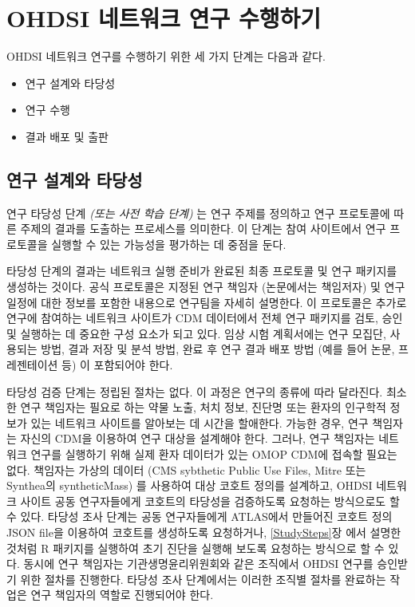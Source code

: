 \documentclass[11pt]{book}
\providecommand{\tightlist}{%
  \setlength{\itemsep}{0pt}\setlength{\parskip}{0pt}}
\theoremstyle{definition}
\theoremstyle{definition}
\theoremstyle{definition}
\theoremstyle{remark}
\begin{document}
\section{OHDSI 네트워크 연구 수행하기}\label{ohdsi---}


OHDSI 네트워크 연구를 수행하기 위한 세 가지 단계는 다음과 같다.

\begin{itemize}
\tightlist
\item
  연구 설계와 타당성
\item
  연구 수행
\item
  결과 배포 및 출판
\end{itemize}

\subsection{연구 설계와 타당성}\label{--}

연구 타당성 단계 \emph{(또는 사전 학습 단계)} 는 연구 주제를 정의하고
연구 프로토콜에 따른 주제의 결과를 도출하는 프로세스를 의미한다. 이
단계는 참여 사이트에서 연구 프로토콜을 실행할 수 있는 가능성을 평가하는
데 중점을 둔다.

타당성 단계의 결과는 네트워크 실행 준비가 완료된 최종 프로토콜 및 연구
패키지를 생성하는 것이다. 공식 프로토콜은 지정된 연구 책임자 (논문에서는
책임저자) 및 연구 일정에 대한 정보를 포함한 내용으로 연구팀을 자세히
설명한다. 이 프로토콜은 추가로 연구에 참여하는 네트워크 사이트가 CDM
데이터에서 전체 연구 패키지를 검토, 승인 및 실행하는 데 중요한 구성
요소가 되고 있다. 임상 시험 계획서에는 연구 모집단, 사용되는 방법, 결과
저장 및 분석 방법, 완료 후 연구 결과 배포 방법 (예를 들어 논문,
프레젠테이션 등) 이 포함되어야 한다.

타당성 검증 단계는 정립된 절차는 없다. 이 과정은 연구의 종류에 따라
달라진다. 최소한 연구 책임자는 필요로 하는 약물 노출, 처치 정보, 진단명
또는 환자의 인구학적 정보가 있는 네트워크 사이트를 알아보는 데 시간을
할애한다. 가능한 경우, 연구 책임자는 자신의 CDM을 이용하여 연구 대상을
설계해야 한다. 그러나, 연구 책임자는 네트워크 연구를 실행하기 위해 실제
환자 데이터가 있는 OMOP CDM에 접속할 필요는 없다. 책임자는 가상의 데이터
(CMS sybthetic Public Use Files, Mitre 또는 Synthea의 syntheticMass) 를
사용하여 대상 코호트 정의를 설계하고, OHDSI 네트워크 사이트 공동
연구자들에게 코호트의 타당성을 검증하도록 요청하는 방식으로도 할 수
있다. 타당성 조사 단계는 공동 연구자들에게 ATLAS에서 만들어진 코호트
정의 JSON file을 이용하여 코호트를 생성하도록 요청하거나,
\ref{StudySteps}장 에서 설명한 것처럼 R 패키지를 실행하여 초기 진단을
실행해 보도록 요청하는 방식으로 할 수 있다. 동시에 연구 책임자는
기관생명윤리위원회와 같은 조직에서 OHDSI 연구를 승인받기 위한 절차를
진행한다. 타당성 조사 단계에서는 이러한 조직별 절차를 완료하는 작업은
연구 책임자의 역할로 진행되어야 한다.
\end{document}
